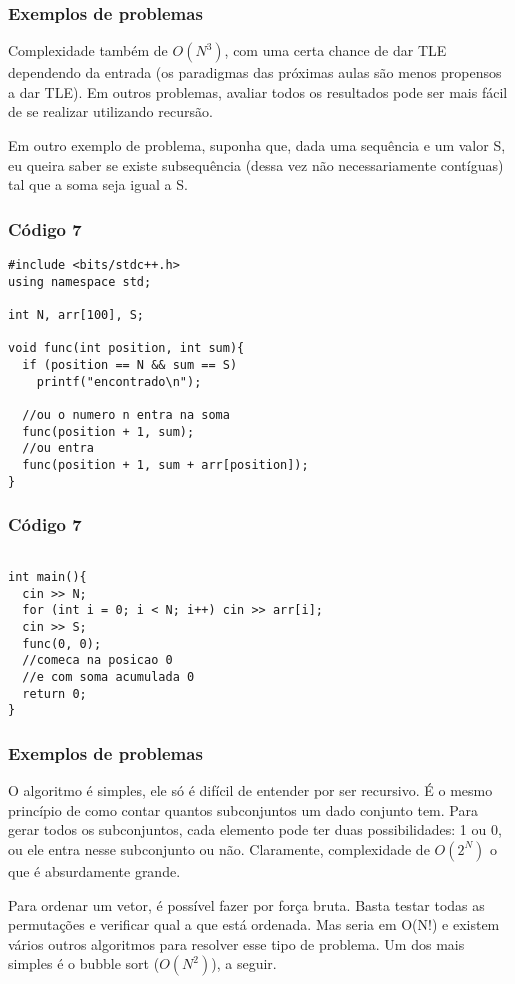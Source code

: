 \documentclass{beamer}
\begin{document}
	\begin{frame}
	\frametitle{Exemplos de problemas}
		Complexidade também de $O(N^{3})$, com uma certa chance de dar TLE dependendo
		da entrada (os paradigmas das próximas aulas são menos propensos a dar TLE).
		Em outros problemas, avaliar todos os resultados pode ser mais fácil de se
		realizar utilizando recursão.\par
		Em outro exemplo de problema, suponha que, dada
		uma sequência e um valor S, eu queira saber se existe subsequência (dessa
		vez não necessariamente contíguas) tal que a soma seja igual a S.
	\end{frame}

	\begin{frame}[fragile]
	\frametitle{Código 7}
		\begin{lstlisting}
#include <bits/stdc++.h>
using namespace std;

int N, arr[100], S;

void func(int position, int sum){
  if (position == N && sum == S)
    printf("encontrado\n");

  //ou o numero n entra na soma
  func(position + 1, sum);
  //ou entra
  func(position + 1, sum + arr[position]);
}
		\end{lstlisting}
	\end{frame}

	\begin{frame}[fragile]
	\frametitle{Código 7}
		\begin{lstlisting}

int main(){
  cin >> N;
  for (int i = 0; i < N; i++) cin >> arr[i];
  cin >> S;
  func(0, 0);
  //comeca na posicao 0
  //e com soma acumulada 0
  return 0;
}
		\end{lstlisting}
	\end{frame}

	\begin{frame}
	\frametitle{Exemplos de problemas}
		O algoritmo é simples, ele só é difícil de entender por ser recursivo. É
		o mesmo princípio de como contar quantos subconjuntos um dado conjunto tem.
		Para gerar todos os subconjuntos, cada elemento pode ter duas possibilidades:
		1 ou 0, ou ele entra nesse subconjunto ou não. Claramente, complexidade
		de $O(2^{N})$ o que é absurdamente grande.\par
		Para ordenar um vetor, é possível
		fazer por força bruta. Basta testar todas as permutações e verificar qual a
		que está ordenada. Mas seria em O(N!) e existem vários outros algoritmos para resolver esse
		tipo de problema. Um dos mais simples é o bubble sort ($O(N^{2})$), a seguir.
	\end{frame}
\end{document}
